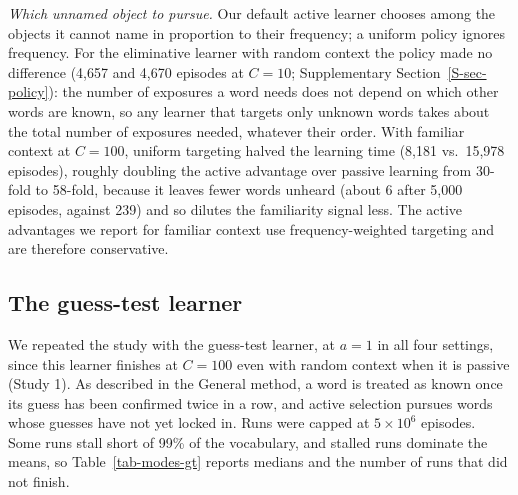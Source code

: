 \documentclass[a4paper,natbib,man]{apa6}
\begin{document}
\textit{Which unnamed object to pursue.} Our default active learner chooses among the objects it cannot name in proportion to their frequency; a uniform policy ignores frequency. For the eliminative learner with random context the policy made no difference (4,657 and 4,670 episodes at $C=10$; Supplementary Section~\ref{S-sec-policy}): the number of exposures a word needs does not depend on which other words are known, so any learner that targets only unknown words takes about the total number of exposures needed, whatever their order. With familiar context at $C=100$, uniform targeting halved the learning time (8,181 vs.\ 15,978 episodes), roughly doubling the active advantage over passive learning from 30-fold to 58-fold, because it leaves fewer words unheard (about 6 after 5,000 episodes, against 239) and so dilutes the familiarity signal less. The active advantages we report for familiar context use frequency-weighted targeting and are therefore conservative.

\subsection{The guess-test learner}
We repeated the study with the guess-test learner, at $a=1$ in all four settings, since this learner finishes at $C=100$ even with random context when it is passive (Study 1). As described in the General method, a word is treated as known once its guess has been confirmed twice in a row, and active selection pursues words whose guesses have not yet locked in. Runs were capped at $5 \times 10^6$ episodes. Some runs stall short of 99\% of the vocabulary, and stalled runs dominate the means, so Table~\ref{tab-modes-gt} reports medians and the number of runs that did not finish.
\end{document}
